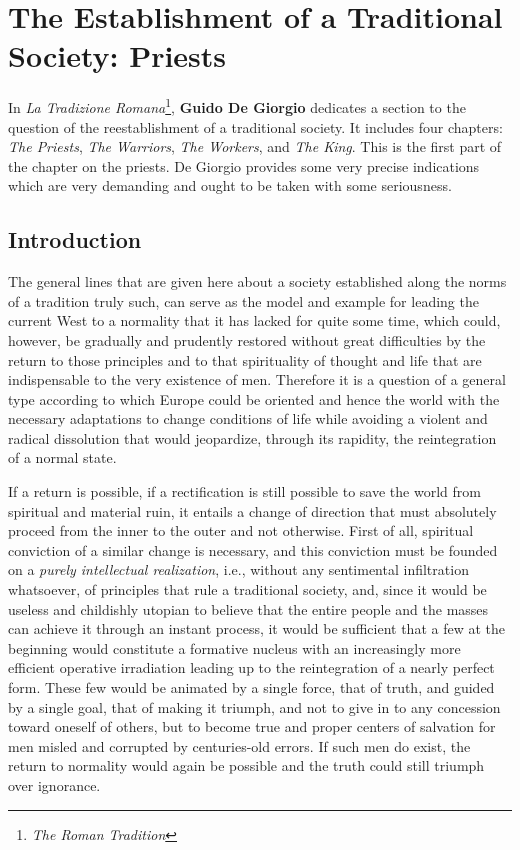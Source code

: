 \section{The Establishment of a Traditional Society: Priests}

\begin{quotex}
In \textit{La Tradizione Romana}\footnote{\textit{The Roman Tradition}}, \textbf{Guido De Giorgio} dedicates a section to the question of the reestablishment of a traditional society. It includes four chapters: \emph{The Priests}, \emph{The Warriors}, \emph{The Workers}, and \emph{The King}. This is the first part of the chapter on the priests. De Giorgio provides some very precise indications which are very demanding and ought to be taken with some seriousness.
\end{quotex}

\subsection*{Introduction}

The general lines that are given here about a society established along the norms of a tradition truly such, can serve as the model and example for leading the current West to a normality that it has lacked for quite some time, which could, however, be gradually and prudently restored without great difficulties by the return to those principles and to that spirituality of thought and life that are indispensable to the very existence of men. Therefore it is a question of a general type according to which Europe could be oriented and hence the world with the necessary adaptations to change conditions of life while avoiding a violent and radical dissolution that would jeopardize, through its rapidity, the reintegration of a normal state.

If a return is possible, if a rectification is still possible to save the world from spiritual and material ruin, it entails a change of direction that must absolutely proceed from the inner to the outer and not otherwise. First of all, spiritual conviction of a similar change is necessary, and this conviction must be founded on a \emph{purely intellectual realization}, i.e., without any sentimental infiltration whatsoever, of principles that rule a traditional society, and, since it would be useless and childishly utopian to believe that the entire people and the masses can achieve it through an instant process, it would be sufficient that a few at the beginning would constitute a formative nucleus with an increasingly more efficient operative irradiation leading up to the reintegration of a nearly perfect form. These few would be animated by a single force, that of truth, and guided by a single goal, that of making it triumph, and not to give in to any concession toward oneself of others, but to become true and proper centers of salvation for men misled and corrupted by centuries-old errors. If such men do exist, the return to normality would again be possible and the truth could still triumph over ignorance.

